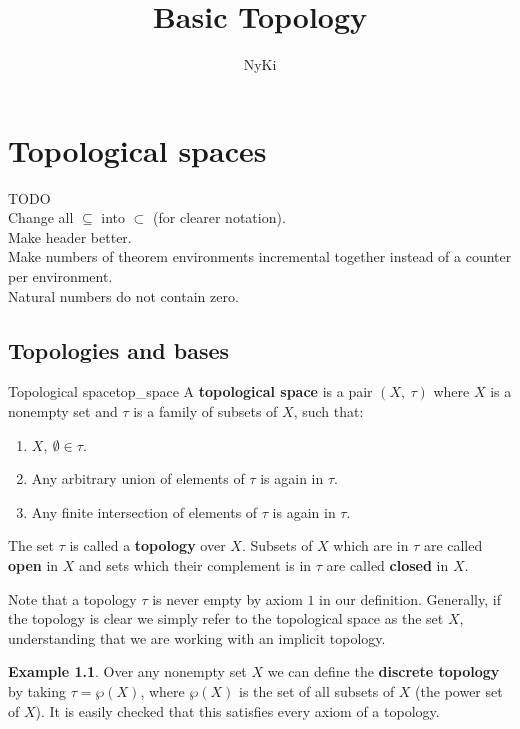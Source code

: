 \documentclass[a4paper]{book}
\author{NyKi}
\title{Basic Topology}
\theoremstyle{definition}
\theoremstyle{ejemplo}
\newtheorem{example}{Example}[section]
\theoremstyle{demostracion}
\begin{document}
\maketitle
\tableofcontents

\pagestyle{fancy}
\chapter{Topological spaces}
TODO\\ 
Change all $\subseteq$ into $\subset$ (for clearer notation).\\ 
Make header better.\\ 
Make numbers of theorem environments incremental together instead of a counter per environment.\\ 
Natural numbers do not contain zero.
\section{Topologies and bases}

\begin{define}{Topological space}{top_space}
	A \textbf{topological space} is a pair $(X,\ \tau)$ where $X$ is a nonempty set and $\tau$ is a family of subsets of $X$, such that:
	\begin{enumerate}
		\item
		$X,\ \emptyset \in \tau$.
		\item
		Any arbitrary union of elements of $\tau$ is again in $\tau$.
		\item
		Any finite intersection of elements of $\tau$ is again in $\tau$.	
	\end{enumerate}	 
	The set $\tau$ is called a \textbf{topology} over $X$.
	Subsets of $X$ which are in $\tau$ are called \textbf{open} in $X$ and sets which their complement is in $\tau$ are called \textbf{closed} in $X$.
\end{define}

Note that a topology $\tau$ is never empty by axiom $1$ in our definition.
Generally, if the topology is clear we simply refer to the topological space as the set $X$, understanding that we are working with an implicit topology.

\begin{example}
	Over any nonempty set $X$ we can define the \textbf{discrete topology} by taking $\tau = \wp(X)$, where $\wp(X)$ is the set of all subsets of $X$ (the power set of $X$). It is easily checked that this satisfies every axiom of a topology.
\end{example}
\end{document}
